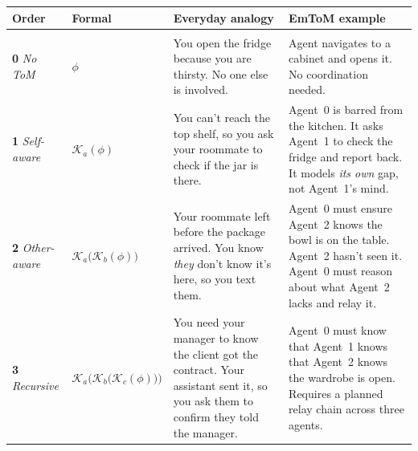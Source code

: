\documentclass{article} %
\begin{document}

\begin{tcolorbox}[
  enhanced,
  colback=tomboxbg,
  colframe=tomboxframe,
  boxrule=0.5pt,
  arc=3pt,
  left=4pt, right=4pt, top=4pt, bottom=4pt,
  title={\small\bfseries Orders of Theory of Mind},
  coltitle=black,
  colbacktitle=tomboxbg,
  toptitle=2pt, bottomtitle=2pt,
  fonttitle=\sffamily,
  attach boxed title to top left={yshift=-2mm, xshift=4mm},
  boxed title style={colback=tomboxbg, colframe=tomboxframe, boxrule=0.5pt, arc=2pt},
  float=t,
]
\footnotesize
\renewcommand{\arraystretch}{1.4}
\setlength{\tabcolsep}{4pt}
\begin{tabularx}{\linewidth}{@{} >{\raggedright\arraybackslash}p{1.1cm} >{\centering\arraybackslash}p{2.4cm} >{\raggedright\arraybackslash}X >{\raggedright\arraybackslash}X @{}}

\textbf{Order} & \textbf{Formal} & \textbf{Everyday analogy} & \textbf{EmToM example} \\[2pt]
\midrule\\[-6pt]

\textbf{0} \newline \textit{\scriptsize No ToM}
& $\phi$
& You open the fridge because you are thirsty. No one else is involved.
& Agent navigates to a cabinet and opens it. No coordination needed. \\[4pt]

\textbf{1} \newline \textit{\scriptsize Self-aware}
& $\mathcal{K}_a(\phi)$
& You can't reach the top shelf, so you ask your roommate to check if the jar is there.
& Agent~0 is barred from the kitchen. It asks Agent~1 to check the fridge and report back. It models \emph{its own} gap, not Agent~1's mind. \\[4pt]

\textbf{2} \newline \textit{\scriptsize Other-aware}
& $\mathcal{K}_a\!\bigl(\mathcal{K}_b(\phi)\bigr)$
& Your roommate left before the package arrived. You know \emph{they} don't know it's here, so you text them.
& Agent~0 must ensure Agent~2 knows the bowl is on the table. Agent~2 hasn't seen it. Agent~0 must reason about what Agent~2 lacks and relay it. \\[4pt]

\textbf{3} \newline \textit{\scriptsize Recursive}
& $\mathcal{K}_a\!\bigl(\mathcal{K}_b\!\bigl(\mathcal{K}_c(\phi)\bigr)\bigr)$
& You need your manager to know the client got the contract. Your assistant sent it, so you ask them to confirm they told the manager.
& Agent~0 must know that Agent~1 knows that Agent~2 knows the wardrobe is open. Requires a planned relay chain across three agents. \\[4pt]


\end{tabularx}
\end{tcolorbox}
\end{document}
